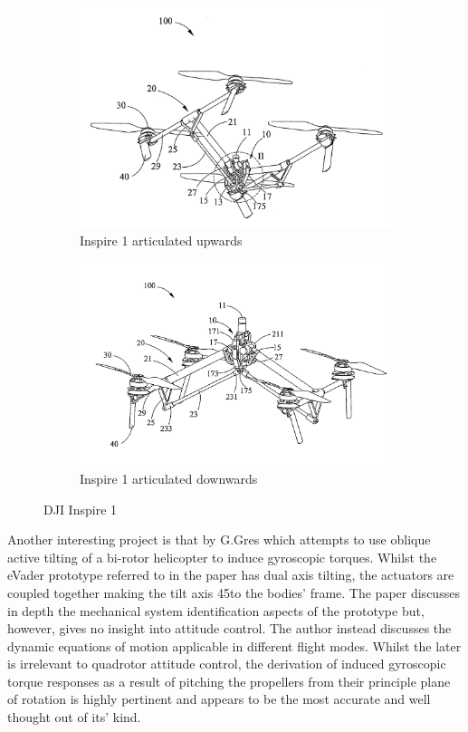 \begin{figure}[htbp]
\centering
\begin{subfigure}{.5\textwidth}
\centering
\includegraphics[width=\textwidth]{figs/dji-inspire1}
\caption{Inspire 1 articulated upwards}
\label{fig:inspireup}
\end{subfigure}%
\begin{subfigure}{.5\textwidth}
\centering
\includegraphics[width=\textwidth]{figs/dji-inspire2}
\caption{Inspire 1 articulated downwards}
\label{fig:inspiredown}
\end{subfigure}
\caption{DJI Inspire 1}
\label{fig:inspire1}
\end{figure}
\par
Another interesting project is that by G.Gres \cite{gres2007} which attempts to use oblique active tilting of a bi-rotor helicopter to induce gyroscopic torques. Whilst the eVader prototype referred to in the paper has dual axis tilting, the actuators are coupled together making the tilt axis 45\textdegree to the bodies' frame. The paper discusses in depth the mechanical system identification aspects of the prototype but, however, gives no insight into attitude control. The author instead discusses the dynamic equations of motion applicable in different flight modes. Whilst the later is irrelevant to quadrotor attitude control, the derivation of induced gyroscopic torque responses as a result of pitching the propellers from their principle plane of rotation is highly pertinent and appears to be the most accurate and well thought out of its' kind.
